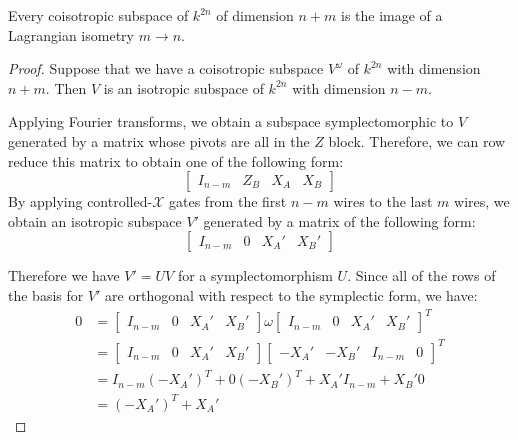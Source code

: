 \begin{theorem}
\label{thm:symstine}

Every coisotropic subspace of $k^{2n}$ of dimension $n+m$ is the image of a Lagrangian isometry $m\to n$.
\end{theorem}
\begin{proof}
Suppose that we have a coisotropic subspace $V^\omega$ of $k^{2n}$ with dimension $n+m$. 
Then $V$ is an isotropic subspace of $k^{2n}$ with dimension $n-m$.

Applying Fourier transforms, we obtain a  subspace symplectomorphic to $V$ generated by a matrix whose pivots are all in the $Z$ block.  Therefore, we can row reduce this matrix to obtain one of the following form:
$$
\left[\begin{array}{cc|cc}
I_{n-m} & Z_B & X_A & X_B 
\end{array}\right]
$$
By applying controlled-$\mathcal X$ gates from the first $n-m$ wires to the last $m$ wires, we obtain an isotropic subspace $V'$ generated by a matrix of the following form:
$$
\left[\begin{array}{cc|cc}
I_{n-m} & 0 & X_A' & X_B' 
\end{array}\right]
$$

Therefore we have $V' = U V$ for a symplectomorphism $U$.
Since all of the rows of the basis for $V'$  are orthogonal with respect to the symplectic form, we have:
\begin{align*}
0 &=
\left[\begin{array}{cc|cc}
I_{n-m} & 0 & X_A' & X_B' 
\end{array}\right]
\omega
\left[\begin{array}{cc|cc}
I_{n-m} & 0 & X_A' & X_B' 
\end{array}\right]^T\\
&=
\left[\begin{array}{cc|cc}
I_{n-m} & 0 & X_A' & X_B' 
\end{array}\right]
\left[\begin{array}{cc|cc}
 -X_A' & -X_B'  & I_{n-m} & 0
\end{array}\right]^T\\
&=
I_{n-m}(-X_A')^T +  0( -X_B' )^T +X_A'I_{n-m} + X_B' 0 \\
&=
(-X_A')^T +X_A'
\end{align*}





\end{proof}

